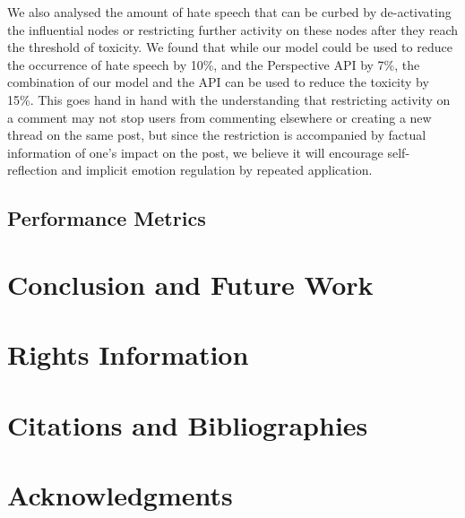 \documentclass[acmtog]{acmart}
\begin{document}
We also analysed the amount of hate speech that can be curbed by de-activating the influential nodes or restricting further activity on these nodes after they reach the threshold of toxicity. We found that while our model could be used to reduce the occurrence of hate speech by 10\%, and the Perspective API by 7\%, the combination of our model and the API can be used to reduce the toxicity by 15\%. This goes hand in hand with the understanding that restricting activity on a comment may not stop users from commenting elsewhere or creating a new thread on the same post, but since the restriction is accompanied by factual information of one's impact on the post, we believe it will encourage self-reflection and implicit emotion regulation by repeated application.





\subsection{Performance Metrics}






\section{Conclusion and Future Work}




\section{Rights Information}







\section{Citations and Bibliographies}



\section{Acknowledgments}












\appendix
\end{document}
